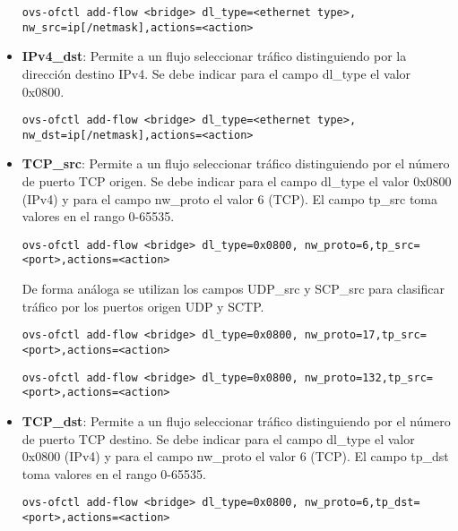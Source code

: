 \begin{itemize}
\begin{center}
\texttt{ovs-ofctl add-flow <bridge> dl\_type=<ethernet type>, nw\_src=ip[/netmask],actions=<action>}
\end{center}

\item \textbf{IPv4\_dst}: Permite a un flujo seleccionar tr\'afico distinguiendo por la dirección destino IPv4. Se debe indicar para el campo dl\_type el valor 0x0800.  

\begin{center}
\texttt{ovs-ofctl add-flow <bridge> dl\_type=<ethernet type>, nw\_dst=ip[/netmask],actions=<action>}
\end{center}
 
\item \textbf{TCP\_src}: Permite a un flujo seleccionar tr\'afico distinguiendo por el n\'umero de puerto TCP origen. Se debe indicar para el campo dl\_type el valor 0x0800 (IPv4) y para el campo nw\_proto el valor 6 (TCP). El campo tp\_src toma valores en el rango 0-65535.

\begin{center}
\texttt{ovs-ofctl add-flow <bridge> dl\_type=0x0800, nw\_proto=6,tp\_src=<port>,actions=<action>}
\end{center}

De forma análoga se utilizan los campos UDP\_src y SCP\_src para clasificar tr\'afico por los puertos origen UDP y SCTP.

\begin{center}
\texttt{ovs-ofctl add-flow <bridge> dl\_type=0x0800, nw\_proto=17,tp\_src=<port>,actions=<action>}
\end{center}

\begin{center}
\texttt{ovs-ofctl add-flow <bridge> dl\_type=0x0800, nw\_proto=132,tp\_src=<port>,actions=<action>}
\end{center}

\item \textbf{TCP\_dst}: Permite a un flujo seleccionar tr\'afico distinguiendo por el n\'umero de puerto TCP destino. Se debe indicar para el campo dl\_type el valor 0x0800 (IPv4) y para el campo nw\_proto el valor 6 (TCP). El campo tp\_dst toma valores en el rango 0-65535.

\begin{center}
\texttt{ovs-ofctl add-flow <bridge> dl\_type=0x0800, nw\_proto=6,tp\_dst=<port>,actions=<action>}
\end{center}


\end{itemize}
